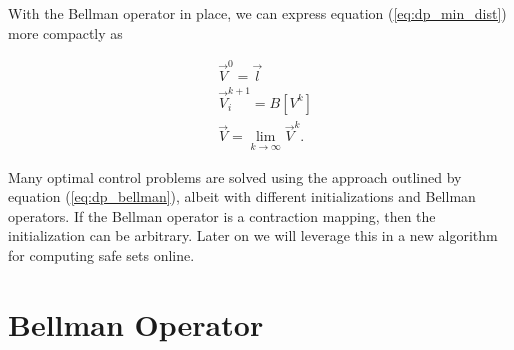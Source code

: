 \documentclass{journal}
\begin{document}
With the Bellman operator in place, we can express equation (\ref{eq:dp_min_dist}) more compactly as

\begin{subequations}\label{eq:dp_bellman}
\begin{align}
&\vec{V}^{0} = \vec{l}\\
&\vec{V}_{i}^{k+1} = B[V^k] \\
&\vec{V} = \lim_{k\rightarrow \infty} \vec{V}^{k}.
\end{align}
\end{subequations}

Many optimal control problems are solved using the approach outlined by equation (\ref{eq:dp_bellman}), albeit with different initializations and Bellman operators. If the Bellman operator is a contraction mapping, then the initialization can be arbitrary. Later on we will leverage this in a new algorithm for computing safe sets online. 

\section{Bellman Operator}
\end{document}
